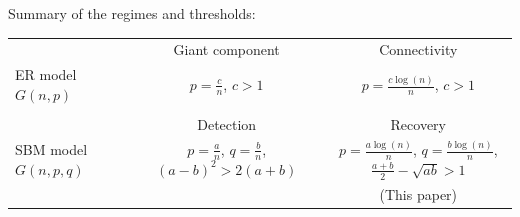 \documentclass[english]{article}
\newcommand{\1}{\textbf{1}}
\begin{document}
Summary of the regimes and thresholds:
\begin{center}
  \begin{tabular}{| l ||  c | c  | }
   \hline
    & Giant component  & Connectivity \\ 
   ER model $G(n,p)$ &  $p=\frac{c}{n}$, $c > 1$  & $p=\frac{c \log(n)}{n}$, $c>1$ \\ 
   &\cite{ER2} & \cite{ER2}\\
    \hline
    \hline
           & Detection  & Recovery \\ 
    SBM model $G(n,p,q)$ & $p=\frac{a}{n}$, $q=\frac{b}{n}$,  $(a-b)^2 >2(a+b)$  & $p=\frac{a \log(n)}{n}$, $q=\frac{b\log(n)}{n}$,  $\frac{a+b}{2} - \sqrt{ab} >1$ \\ 
    &\cite{Massoulie_SBM,Mossel_SBM2} & (This paper)\\
    \hline
  \end{tabular}
\end{center}










\end{document}
